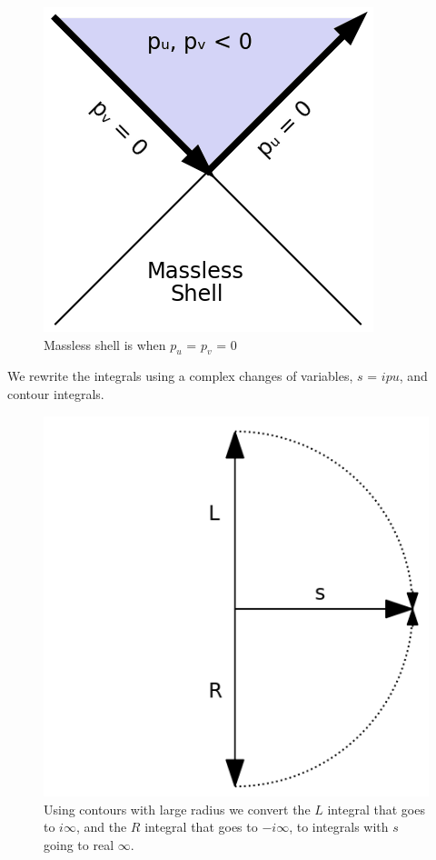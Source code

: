 \documentclass[12pt,a4paper]{article}
\begin{document}
\begin{figure}[h]
\centering
\includegraphics[scale=0.5]{massless_shell.png}
\caption{Massless shell is when $p_u$ = $p_v$ = 0}
\label{masslessshell}
\end{figure}


We rewrite the integrals using a complex changes of variables, $s$ = $ipu$, and contour integrals.

\begin{figure}[h]
\centering
\includegraphics[scale=0.3]{contour.png}
\caption{Using contours with large radius we convert the $L$ integral that goes to $i\infty$, and the $R$ integral that goes to $-i\infty$, to integrals with $s$ going to real $\infty$.}
\label{fig:x cubed graph}
\end{figure}
\end{document}
